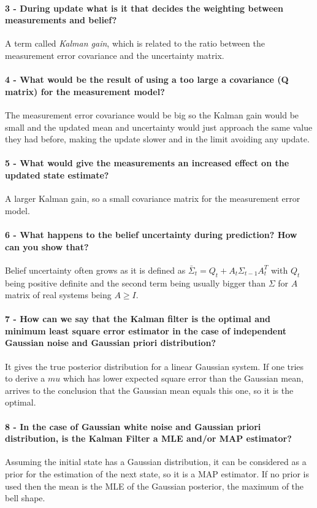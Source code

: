 \documentclass[12pt]{article}
\begin{document}
\paragraph{3 - During update what is it that decides the weighting between measurements and belief?}
A term called \textit{Kalman gain}, which is related to the ratio between the measurement error covariance and the  uncertainty matrix.
\paragraph{4 - What would be the result of using a too large a covariance (Q matrix) for the measurement model?}
The measurement error covariance would be big so the Kalman gain would be small and the updated mean and uncertainty would just approach the same value they had before, making the update slower and in the limit avoiding any update.
\paragraph{5 - What would give the measurements an increased effect on the updated state estimate?}
A larger Kalman gain, so a small covariance matrix for the measurement error model.
\paragraph{6 - What happens to the belief uncertainty during prediction? How can you show that?}
Belief uncertainty often grows as it is defined as \(\bar{\Sigma}_t=Q_t+A_t\Sigma_{t-1}A_t^T\) with \(Q_t\) being positive definite and the second term being usually bigger than \(\Sigma\) for \(A\) matrix of real systems being \(A \geq I\).
\paragraph{7 - How can we say that the Kalman filter is the optimal and minimum least square error estimator in the case of independent Gaussian noise and Gaussian priori distribution?}
It gives the true posterior distribution for a linear Gaussian system. If one tries to derive a \(mu\) which has lower expected square error than the Gaussian mean, arrives to the conclusion that the Gaussian mean equals this one, so it is the optimal.
\paragraph{8 - In the case of Gaussian white noise and Gaussian priori distribution, is
the Kalman Filter a MLE and/or MAP estimator?}
Assuming the initial state has a Gaussian distribution, it can be considered as a prior for the estimation of the next state, so it is a MAP estimator. If no prior is used then the mean is the MLE of the Gaussian posterior, the maximum of the bell shape.
\end{document}
